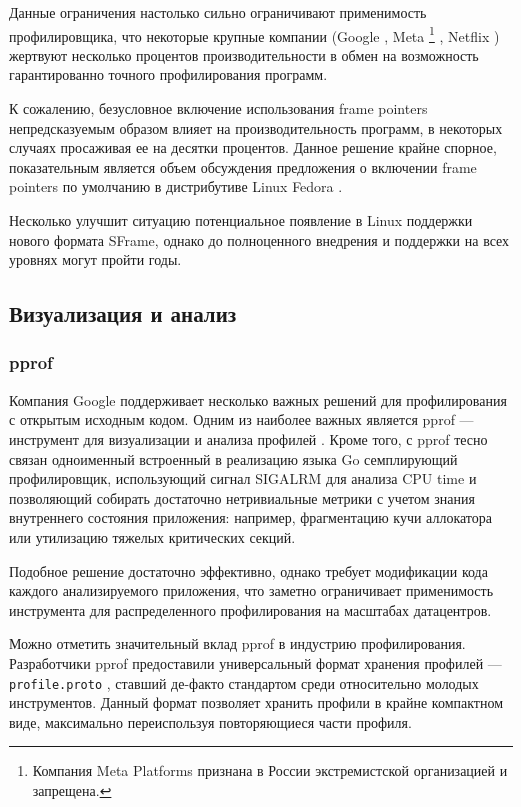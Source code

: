Данные ограничения настолько сильно ограничивают применимость профилировщика, что некоторые крупные компании
(Google \cite{fp:google}, Meta \footnote{Компания Meta Platforms признана в России экстремистской организацией и запрещена.}
\cite{fp:meta}, Netflix \cite{fp:netflix})
жертвуют несколько процентов производительности в обмен на возможность гарантированно точного профилирования программ.

К сожалению, безусловное включение использования frame pointers непредсказуемым образом влияет на производительность программ,
в некоторых случаях просаживая ее на десятки процентов. Данное решение крайне спорное, показательным является объем обсуждения
предложения о включении frame pointers по умолчанию в дистрибутиве Linux Fedora \cite{fp:fedora}.

Несколько улучшит ситуацию потенциальное появление в Linux поддержки нового формата SFrame, однако до полноценного внедрения и поддержки
на всех уровнях могут пройти годы.

\subsection{Визуализация и анализ}
\subsubsection{pprof}
Компания Google поддерживает несколько важных решений для профилирования с открытым исходным кодом.
Одним из наиболее важных является pprof --- инструмент для визуализации и анализа профилей \cite{pprof}.
Кроме того, с pprof тесно связан одноименный встроенный в реализацию языка Go семплирующий профилировщик,
использующий сигнал SIGALRM для анализа CPU time \cite{pprof:golang} и позволяющий собирать достаточно нетривиальные метрики
с учетом знания внутреннего состояния приложения: например, фрагментацию кучи аллокатора или утилизацию тяжелых критических секций.

Подобное решение достаточно эффективно, однако требует модификации кода каждого анализируемого приложения,
что заметно ограничивает применимость инструмента для распределенного профилирования на масштабах датацентров.

Можно отметить значительный вклад pprof в индустрию профилирования.
Разработчики pprof предоставили универсальный формат хранения профилей
--- \verb!profile.proto! \cite{pprof:proto}, ставший де-факто стандартом
среди относительно молодых инструментов.
Данный формат позволяет хранить профили в крайне компактном виде, максимально переиспользуя повторяющиеся части профиля.

